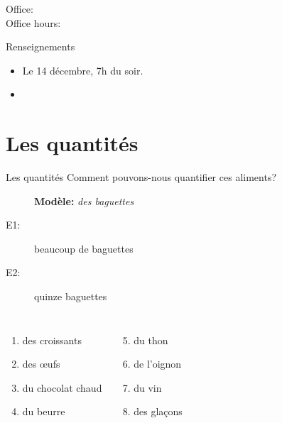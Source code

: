 \documentclass{beamer}
\subtitle[Révision: Examen final]{La révision pour l'examen final}
\begin{document}
  \begin{frame}
    \titlepage
    \tiny{Office: \\
          Office hours: }
  \end{frame}

  \begin{frame}{Renseignements}
    \begin{itemize}
      \item Le 14 décembre, 7h du soir.
      \item[] 
    \end{itemize}
  \end{frame}

  \begin{frame}
    \tableofcontents[hideallsubsections]
  \end{frame}

  \section{Les quantités}
    \begin{frame}{Les quantités}
      Comment pouvons-nous quantifier ces aliments?
      \begin{description}
        \item[] \textbf{Modèle:} \emph{des baguettes}
        \item[E1:] beaucoup de baguettes
        \item[E2:] quinze baguettes
      \end{description}
      \begin{columns}
          \begin{enumerate}
            \item des croissants
            \item des œufs
            \item du chocolat chaud
            \item du beurre
          \end{enumerate}
          \begin{enumerate}
            \setcounter{enumi}{4}
            \item du thon
            \item de l'oignon
            \item du vin
            \item des glaçons
          \end{enumerate}
      \end{columns}
    \end{frame}
\end{document}
